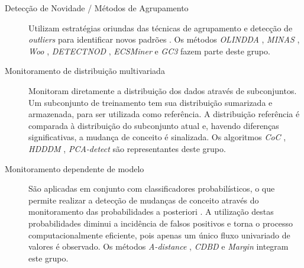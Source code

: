 \documentclass[qual, classic, a4paper]{ufbathesis}
\begin{document}
\begin{description}
    \item[Detecção de Novidade / Métodos de Agrupamento] 
    Utilizam estratégias oriundas das técnicas de agrupamento e detecção de \textit{outliers} para identificar novos padrões \cite{Ryu:Kantardzic:2012}.
    Os métodos 
    \textit{OLINDDA} \cite{Spinosa:2007:OCA:1244002.1244107},
    \textit{MINAS} \cite{Faria:2013:NDA:2480362.2480515},
    \textit{Woo} \cite{Ryu:Kantardzic:2012},
    \textit{DETECTNOD} \cite{Hashemi:Hayat:DETECTNOD:2010},
    \textit{ECSMiner} \cite{Masud:2011:CNC:1978259.1978529} e
    \textit{GC3} \cite{Sethi2016b:GC3} fazem parte deste grupo.
    
    \item[Monitoramento de distribuição multivariada]
    Monitoram diretamente a distribuição dos dados através de subconjuntos.
    Um subconjunto de treinamento tem sua distribuição sumarizada e armazenada, para ser utilizada como referência.
    A distribuição referência é comparada à distribuição do subconjunto atual e, havendo diferenças significativas, a mudança de conceito é sinalizada.
    Os algoritmos
    \textit{CoC} \cite{Lee:Magoules:CoC:2012},
    \textit{HDDDM} \cite{Ditzler:Polikar:HDDDM:2011},
    \textit{PCA-detect} \cite{Kuncheva:PCADetect:20085}
    são representantes deste grupo.

    \item[Monitoramento dependente de modelo]
    São aplicadas em conjunto com classificadores probabilísticos,
    o que permite realizar a detecção de mudanças de conceito através do monitoramento das probabilidades a posteriori \cite{Zliobaite:2010}.
    A utilização destas probabilidades diminui a incidência de falsos positivos e torna o processo computacionalmente eficiente, 
    pois apenas um único fluxo univariado de valores é observado.
    Os métodos 
    \textit{A-distance} \cite{Dredze:ADistance:2010585},
    \textit{CDBD} \cite{Lindstrom:CDBD:2013} e
    \textit{Margin} \cite{Dries:Margin:2009} integram este grupo.
\end{description}
\end{document}
